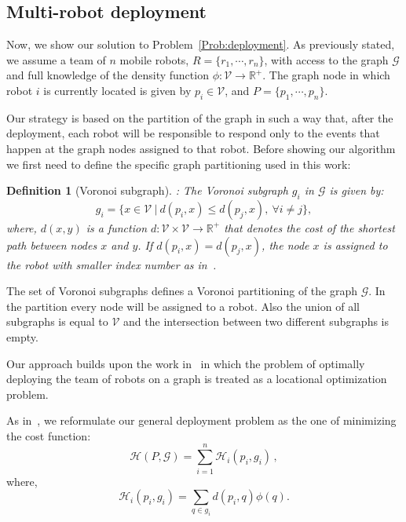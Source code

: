\documentclass[smallcondensed]{svjour3}
\newtheorem{mydef}{Definition}
\begin{document}
\subsection{Multi-robot deployment}
\label{sec:MulRobDep}

Now, we show our solution to Problem~\ref{Prob:deployment}. As previously stated, we assume a team of $n$ mobile robots, $R=\{r_1,\cdots,r_n\}$, with access to the graph $\mathcal{G}$ and full knowledge of the density function $\phi: \mathcal{V} \rightarrow \mathbb{R}^+$. The graph node in which robot $i$ is currently located is given by $p_i \in \mathcal V$, and $P=\{p_1,\cdots,p_n\}$. 

Our strategy is based on the partition of the graph in such a way that, after the deployment, each robot will be responsible to respond only to the events that happen at the graph nodes assigned to that robot. Before showing our algorithm we first need to define the specific graph partitioning used in this work: 

\begin{mydef}[Voronoi subgraph]:
\label{def:voronoi}
\textnormal{
The Voronoi subgraph $g_i$ in $\mathcal{G}$ is given by:
}
%
\begin{equation}
\label{eq:VoronoiregionCVT} 
g_i = \{x \in \mathcal{V}~ |~ d(p_i,x) \leq d(p_j,x),~ \forall i \neq j \},
\end{equation}
%
\textnormal{where, $d(x,y)$ is a function $d:\mathcal V \times \mathcal V \rightarrow \mathbb R^+$ that denotes the cost of the shortest path between nodes $x$ and $y$. If $d(p_i,x) = d(p_j,x)$, the node $x$ is assigned to the robot with smaller index number as in~\cite{Yun2013}.}
\end{mydef}
The set of Voronoi subgraphs defines a Voronoi partitioning of the graph $\mathcal{G}$. In the partition every node will be assigned to a robot. Also the union of all subgraphs is equal to $\mathcal{V}$ and the intersection between two different subgraphs is empty.

Our approach builds upon the work in~\cite{Yun2013} in which the problem of optimally deploying the team of robots on a graph is treated as a locational optimization problem. 

As in~\cite{Yun2013}, we reformulate our general deployment problem as the one of minimizing the cost function:
\begin{equation}\label{eq:functional1}
\mathcal{H}(P,\mathcal G) =
\sum_{i = 1}^{n} \mathcal{H}_{i}(p_i,g_i) \,,
\end{equation}
%
where,
% 
\begin{equation}
\label{eq:functional2}
\mathcal{H}_{i}(p_i,g_i) = \sum_{q \in g_i}
d(p_i,q)\phi(q) .
\end{equation}
 
\end{document}
